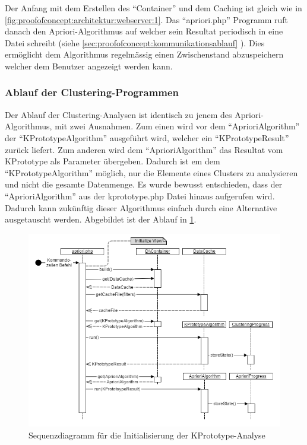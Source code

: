 Der Anfang mit dem Erstellen des "`Container"' und dem Caching ist gleich wie in \cref{fig:proofofconcept:architektur:webserver:1}. Das "`apriori.php"' Programm ruft danach den Apriori-Algorithmus auf welcher sein Resultat periodisch in eine Datei schreibt (siehe \cref{sec:proofofconcept:kommunikationsablauf} ). Dies ermöglicht dem Algorithmus regelmässig einen Zwischenstand abzuspeichern welcher dem Benutzer angezeigt werden kann.

\subsubsection{Ablauf der Clustering-Programmen}
Der Ablauf der Clustering-Analysen ist identisch zu jenem des Apriori-Algorithmus, mit zwei Ausnahmen. Zum einen wird vor dem "`AprioriAlgorithm"' der "`KPrototypeAlgorithm"' ausgeführt wird, welcher ein "`KPrototypeResult"' zurück liefert. 
Zum anderen wird dem "`AprioriAlgorithm"' das Resultat vom KPrototype als Parameter übergeben. Dadurch ist em dem "`KPrototypeAlgorithm"' möglich, nur die Elemente eines Clusters zu analysieren und nicht die gesamte Datenmenge. 
Es wurde bewusst entschieden, dass der "`AprioriAlgorithm"' aus der kprototype.php Datei hinaus aufgerufen wird. Dadurch kann zukünftig dieser Algorithmus einfach durch eine Alternative ausgetauscht werden.
Abgebildet ist der Ablauf in \cref{fig:proofofconcept:architektur:hintergrundprozesser:2}. 
\begin{figure}[H]
	\centering
	\includegraphics[width=1\textwidth]{images/diagram-sequence-kprototype}
	\caption{Sequenzdiagramm für die Initialisierung der KPrototype-Analyse}
	\label{fig:proofofconcept:architektur:hintergrundprozesser:2}
\end{figure}

